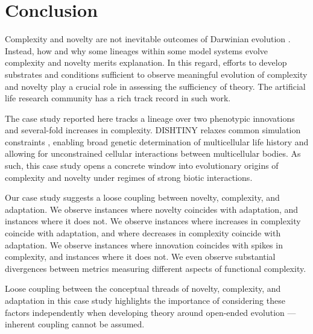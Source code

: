\section{Conclusion}

Complexity and novelty are not inevitable outcomes of Darwinian evolution \citep{stanley2017open}.
Instead, how and why some lineages within some model systems evolve complexity and novelty merits explanation.
In this regard, efforts to develop substrates and conditions sufficient to observe meaningful evolution of complexity and novelty play a crucial role in assessing the sufficiency of theory.
The artificial life research community has a rich track record in such work.

The case study reported here tracks a lineage over two phenotypic innovations and several-fold increases in complexity.
DISHTINY relaxes common simulation constraints \citep{goldsby2012task, goldsby2014evolutionary}, enabling broad genetic determination of multicellular life history and allowing for unconstrained cellular interactions between multicellular bodies.
As such, this case study opens a concrete window into evolutionary origins of complexity and novelty under regimes of strong biotic interactions.

Our case study suggests a loose coupling between novelty, complexity, and adaptation.
We observe instances where novelty coincides with adaptation, and instances where it does not.
We observe instances where increases in complexity coincide with adaptation, and where decreases in complexity coincide with adaptation.
We observe instances where innovation coincides with spikes in complexity, and instances where it does not.
We even observe substantial divergences between metrics measuring different aspects of functional complexity.

Loose coupling between the conceptual threads of novelty, complexity, and adaptation in this case study highlights the importance of considering these factors independently when developing theory around open-ended evolution --- inherent coupling cannot be assumed.

